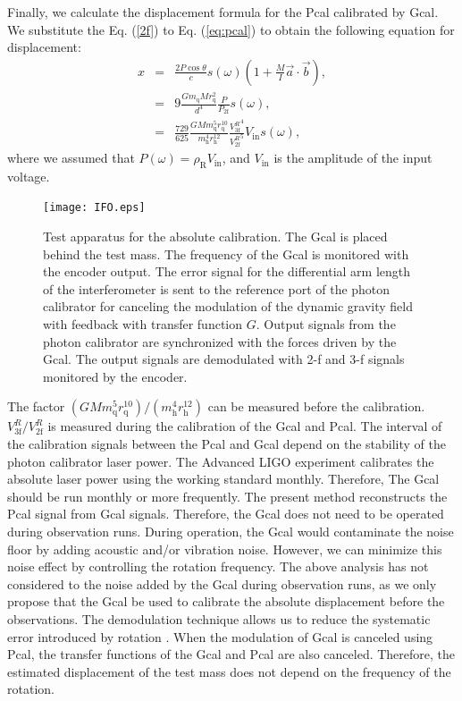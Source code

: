 \documentclass[%
 reprint,
superscriptaddress,
 amsmath,amssymb,
 aps,
]{revtex4-1}
\begin{document}
Finally, we calculate the displacement formula for the Pcal calibrated by Gcal. We substitute the Eq. (\ref{2f}) to  Eq. (\ref{eq:pcal}) to obtain the following equation for displacement:
\begin{eqnarray}
x&=&\frac{2P \cos{\theta}}{c} s(\omega)\left(1+\frac{M}{I}\vec{a} \cdot \vec{b} \right), \\
 &=&9\frac{Gm_{\mathrm{q}} M r_{\mathrm{q}}^2}{d^4}\frac{P}{P_{\mathrm{2f}}}s(\omega) , \\
 &=&\frac{729}{625} \frac{GM m^5_{\mathrm{q}} r_{\mathrm{q}}^{10}}{m^4_{\mathrm{h}} r_{\mathrm{h}}^{12} } \frac{{V_{\mathrm{3f}}^{R}}^4}{{V_{\mathrm{2f}}^{R}}^5}V_{\mathrm{in}} s(\omega)  , \label{pcal_new}
\end{eqnarray}
where we assumed that $P(\omega)=\rho_{\mathrm{R}} V_{\mathrm{in}}$, and $V_{\mathrm{in}}$ is the amplitude of the input voltage.
\begin{figure}
\begin{center}
\texttt{[image: IFO.eps]}
\caption{Test apparatus for the absolute calibration. The Gcal is placed behind the test mass. The frequency of the Gcal is monitored with the encoder output. The error signal for the differential arm length of the interferometer is sent to the reference port of the photon calibrator for canceling the modulation of the dynamic gravity field with feedback with transfer function $G$. Output signals from the photon calibrator are synchronized with the forces driven by the Gcal. The output signals are demodulated with 2-f and 3-f signals monitored by the encoder.}
\label{fig:IFO}
\end{center}
\end{figure}
The factor $(GMm_{\mathrm{q}}^5 r_{\mathrm{q}}^{10})/(m_{\mathrm{h}}^4 r_{\mathrm{h}}^{12})$ can be measured before the calibration.  $V^R_{\mathrm{3f}}/V^R_{\mathrm{2f}}$ is measured during the calibration of the Gcal and Pcal. The interval of the calibration signals between the Pcal and Gcal depend on the stability of the photon calibrator laser power. The Advanced LIGO experiment calibrates the absolute laser power using the working standard monthly. Therefore, The Gcal should be run monthly or more frequently. The present method reconstructs the Pcal signal from Gcal signals.  Therefore, the Gcal does not need to be operated during observation runs.
During operation, the Gcal would contaminate the noise floor by adding acoustic and/or vibration noise. However, we can minimize this noise effect by controlling the rotation frequency. The above analysis has not considered to the noise added by the Gcal during observation runs, as we only propose that the Gcal be used to calibrate the absolute displacement before the observations.
The demodulation technique allows us to reduce the systematic error introduced by rotation . When the modulation of Gcal is canceled using  Pcal, the transfer functions of the Gcal and Pcal are also canceled. Therefore, the estimated displacement of the test mass does not depend on the frequency of the rotation. 
\end{document}

